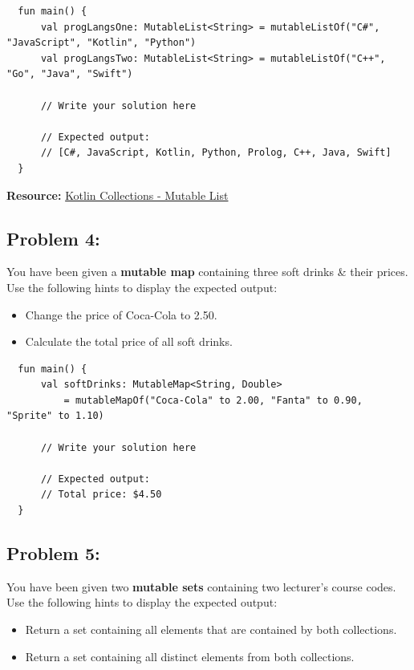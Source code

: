 \documentclass{article}
\begin{document}
\begin{verbatim}
  fun main() {
      val progLangsOne: MutableList<String> = mutableListOf("C#", "JavaScript", "Kotlin", "Python")
      val progLangsTwo: MutableList<String> = mutableListOf("C++", "Go", "Java", "Swift")
    
      // Write your solution here
    
      // Expected output:
      // [C#, JavaScript, Kotlin, Python, Prolog, C++, Java, Swift]
  }
\end{verbatim}

\textbf{Resource:} \href{https://kotlinlang.org/api/latest/jvm/stdlib/kotlin.collections/-mutable-list/}{Kotlin Collections - Mutable List}

\subsection*{Problem 4:} You have been given a \textbf{mutable map} containing three soft drinks \& their prices. Use the following hints to display the expected output:
\begin{itemize}
  \item Change the price of Coca-Cola to 2.50.
  \item Calculate the total price of all soft drinks.
\end{itemize}

\begin{verbatim}
  fun main() {
      val softDrinks: MutableMap<String, Double> 
          = mutableMapOf("Coca-Cola" to 2.00, "Fanta" to 0.90, "Sprite" to 1.10)

      // Write your solution here

      // Expected output:
      // Total price: $4.50
  }
\end{verbatim}

\subsection*{Problem 5:} You have been given two \textbf{mutable sets} containing two lecturer's course codes. Use the following hints to display the expected output:
\begin{itemize}
  \item Return a set containing all elements that are contained by both collections. 
  \item Return a set containing all distinct elements from both collections.
\end{itemize}
\end{document}

